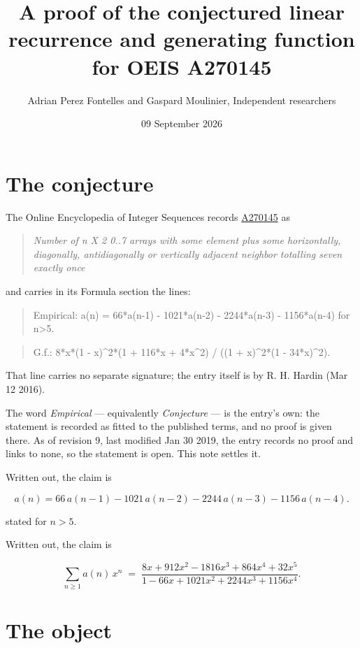 \documentclass[11pt]{article}
\title{A proof of the conjectured linear recurrence and generating function for OEIS A270145}
\author{Adrian Perez Fontelles and Gaspard Moulinier, Independent researchers}
\date{09 September 2026}
\theoremstyle{definition}
\begin{document}
\maketitle
\section{The conjecture}

The Online Encyclopedia of Integer Sequences records \href{https://oeis.org/A270145}{A270145} as

\begin{quote}\itshape Number of n X 2 0..7 arrays with some element plus some horizontally, diagonally, antidiagonally or vertically adjacent neighbor totalling seven exactly once\end{quote}

and carries in its Formula section the lines:

\begin{quote}\ttfamily Empirical: a(n) = 66*a(n-1) - 1021*a(n-2) - 2244*a(n-3) - 1156*a(n-4) for n>5.\end{quote}

\begin{quote}\ttfamily G.f.: 8*x*(1 - x)\textasciicircum{}2*(1 + 116*x + 4*x\textasciicircum{}2) / ((1 + x)\textasciicircum{}2*(1 - 34*x)\textasciicircum{}2).\end{quote}

That line carries no separate signature; the entry itself is by R. H. Hardin (Mar 12 2016).

The word {\itshape Empirical} --- equivalently {\itshape Conjecture} --- is the entry's own: the statement is recorded as fitted to the published terms, and no proof is given there. As of revision 9, last modified Jan 30 2019, the entry records no proof and links to none, so the statement is open. This note settles it.

Written out, the claim is

\[a(n) = 66\,a(n-1) - 1021\,a(n-2) - 2244\,a(n-3) - 1156\,a(n-4).\]

stated for $n > 5$.

Written out, the claim is

\[\sum_{n \ge 1} a(n)\,x^n \;=\; \frac{8x + 912x^{2} - 1816x^{3} + 864x^{4} + 32x^{5}}{1 - 66x + 1021x^{2} + 2244x^{3} + 1156x^{4}}.\]

\section{The object}
\end{document}
